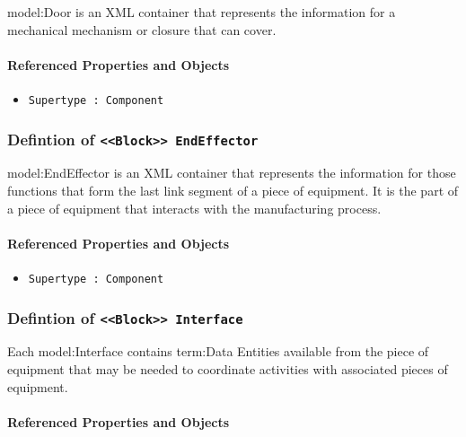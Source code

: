 \FloatBarrier

{model:Door} is an XML container that represents the information for a mechanical mechanism or closure that can cover.

\FloatBarrier
\paragraph{Referenced Properties and Objects}

\begin{itemize}
\item \texttt{Supertype : Component}

\end{itemize}
\FloatBarrier
\subsubsection{Defintion of \texttt{<<Block>> EndEffector}}
  \label{type:EndEffector}

\FloatBarrier

{model:EndEffector} is an XML container that represents the information for those functions that form the last link segment of a piece of equipment. It is the part of a piece of equipment that interacts with the manufacturing process.

\FloatBarrier
\paragraph{Referenced Properties and Objects}

\begin{itemize}
\item \texttt{Supertype : Component}

\end{itemize}
\FloatBarrier
\subsubsection{Defintion of \texttt{<<Block>> Interface}}
  \label{type:Interface}

\FloatBarrier

Each {model:Interface} contains {term:Data Entities} available from the piece of equipment that may be needed to coordinate activities with associated pieces of equipment.

\FloatBarrier
\paragraph{Referenced Properties and Objects}

